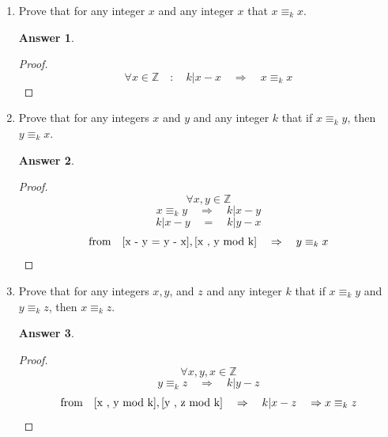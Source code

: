 \documentclass[a4paper]{article}
\renewcommand{\(}{\left(}
\renewcommand{\)}{\right)}
\theoremstyle{plain}
\theoremstyle{plain}
\theoremstyle{definition}
\newtheorem*{answer}{Answer}
\begin{document}
\begin{enumerate}[label*=\roman*.,ref=\roman*]
\item Prove that for any integer $x$ and any integer $x$ that $ x \equiv_k x $.
\begin{shaded}
\begin{answer}
\begin{proof}
 $$ \forall x \in \mathds{Z} \quad : \quad k | x - x \quad \Rightarrow \quad x \equiv_k x $$
\end{proof}
\end{answer}
\end{shaded}

\item Prove that for any integers $x$ and $y$ and any integer $k$ that if $x \equiv_k y$, then $y \equiv_k x$.
\begin{shaded}
\begin{answer}
\begin{proof}
$$ \forall x , y \in \mathds{Z} $$
\begin{equation}\label{x , y mod k}
x \equiv_k y \quad \Rightarrow \quad k | x - y
\end{equation}
\begin{equation}\label{x - y = y - x}
  k | x - y \quad = \quad k | y - x
\end{equation}
$$ \text{from} \quad \ref{x - y = y - x}, \ref{x , y mod k} \quad \Rightarrow \quad y \equiv_k x $$
\end{proof}
\end{answer}
\end{shaded}

\item Prove that for any integers $x, y$, and $z$ and any integer $k$ that if $x \equiv_k y$ and $y \equiv_k z$, then $x \equiv_k z$.
\begin{shaded}
\begin{answer}
\begin{proof}
$$ \forall x , y , x \in \mathds{Z} $$
\begin{equation}\label{y , z mod k}
  y \equiv_k z \quad \Rightarrow \quad k | y - z
\end{equation}
$$ \text{from} \quad \ref{x , y mod k} , \ref{y , z mod k} \quad \Rightarrow \quad k | x - z \quad \Rightarrow x \equiv_k z  $$
\end{proof}
\end{answer}
\end{shaded}


\end{enumerate}
\end{document}
